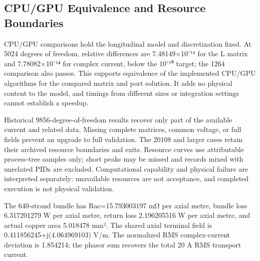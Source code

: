 \documentclass[journal,10pt]{IEEEtran}
\begin{document}
\subsection*{CPU/GPU Equivalence and Resource Boundaries}
\hypertarget{03.compute.heading}{}
CPU/GPU comparisons hold the longitudinal model and discretization fixed. At 5024 degrees of freedom, relative differences are 7.48149×10⁻¹⁶ for the L matrix and 7.78082×10⁻¹⁴ for complex current, below the 10⁻¹⁰ target; the 1264 comparison also passes. This supports equivalence of the implemented CPU/GPU algorithms for the compared matrix and port solution. It adds no physical content to the model, and timings from different sizes or integration settings cannot establish a speedup.


Historical 9856-degree-of-freedom results recover only part of the available current and related data. Missing complete matrices, common voltage, or full fields prevent an upgrade to full validation. The 20108 and larger cases retain their archived resource boundaries and exits. Resource curves use attributable process-tree samples only; short peaks may be missed and records mixed with unrelated PIDs are excluded. Computational capability and physical failure are interpreted separately: unavailable resources are not acceptance, and completed execution is not physical validation.


The 640-strand bundle has Rac=15.793003197 mΩ per axial metre, bundle loss 6.317201279 W per axial metre, return loss 2.196205516 W per axial metre, and actual copper area 5.018478 mm². The shared axial terminal field is 0.411856245+j(4.064969103) V/m. The normalized RMS complex-current deviation is 1.854214; the phasor sum recovers the total 20 A RMS transport current.
\end{document}
